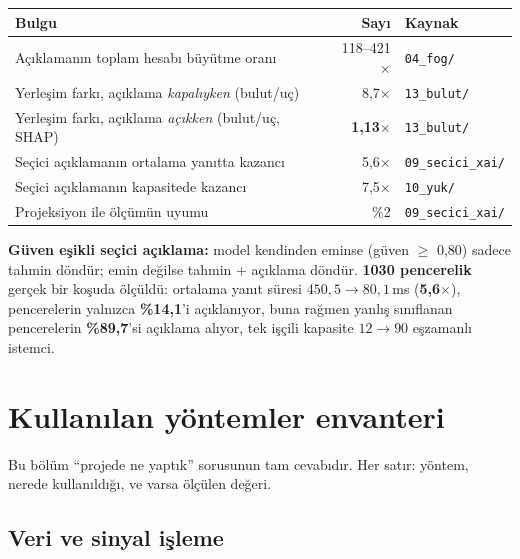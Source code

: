 \documentclass[11pt,a4paper]{article}
\newcommand{\ms}{\,ms}
\newcommand{\dosya}[1]{\texttt{\footnotesize #1}}
\begin{document}
\begin{table}[H]
\centering\small
\begin{tabular}{@{}p{7.6cm}rl@{}}
\toprule
\textbf{Bulgu} & \textbf{Sayı} & \textbf{Kaynak} \\
\midrule
Açıklamanın toplam hesabı büyütme oranı & 118--421$\times$ & \dosya{04\_fog/} \\
Yerleşim farkı, açıklama \emph{kapalıyken} (bulut/uç) & 8{,}7$\times$ & \dosya{13\_bulut/} \\
Yerleşim farkı, açıklama \emph{açıkken} (bulut/uç, SHAP) & \textbf{1{,}13$\times$} & \dosya{13\_bulut/} \\
Seçici açıklamanın ortalama yanıtta kazancı & 5{,}6$\times$ & \dosya{09\_secici\_xai/} \\
Seçici açıklamanın kapasitede kazancı & 7{,}5$\times$ & \dosya{10\_yuk/} \\
Projeksiyon ile ölçümün uyumu & \%2 & \dosya{09\_secici\_xai/} \\
\bottomrule
\end{tabular}
\end{table}

\begin{bulgu}
\textbf{Güven eşikli seçici açıklama:} model kendinden eminse (güven $\geq$
0{,}80) sadece tahmin döndür; emin değilse tahmin + açıklama döndür.
\textbf{1030 pencerelik} gerçek bir koşuda ölçüldü: ortalama yanıt süresi
$450{,}5 \rightarrow 80{,}1$\ms{} (\textbf{5{,}6$\times$}), pencerelerin
yalnızca \textbf{\%14{,}1}'i açıklanıyor, buna rağmen yanlış sınıflanan
pencerelerin \textbf{\%89{,}7}'si açıklama alıyor, tek işçili kapasite
$12 \rightarrow 90$ eşzamanlı istemci.
\end{bulgu}

\section{Kullanılan yöntemler envanteri}

Bu bölüm ``projede ne yaptık'' sorusunun tam cevabıdır. Her satır: yöntem,
nerede kullanıldığı, ve varsa ölçülen değeri.

\subsection{Veri ve sinyal işleme}
\end{document}

